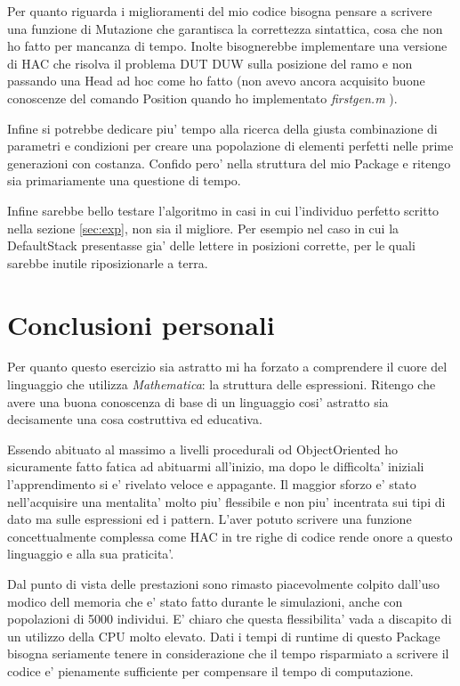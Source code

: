 \documentclass[12pt, a4paper]{article}
\begin{document}
Per quanto riguarda i miglioramenti del mio codice bisogna pensare a scrivere una funzione di Mutazione che garantisca la correttezza sintattica, cosa che non ho fatto per mancanza di tempo. Inolte bisognerebbe implementare una versione di HAC che risolva il problema DUT DUW sulla posizione del ramo e non passando una Head ad hoc come ho fatto (non avevo ancora acquisito buone conoscenze del comando Position quando ho implementato {\itshape firstgen.m }).

Infine si potrebbe dedicare piu' tempo alla ricerca della giusta combinazione di parametri e condizioni per creare una popolazione di elementi perfetti nelle prime generazioni con costanza. Confido pero' nella struttura del mio Package e ritengo sia primariamente una questione di tempo.

Infine sarebbe bello testare l'algoritmo in casi in cui l'individuo perfetto scritto nella sezione \ref{sec:exp}, non sia il migliore. Per esempio nel caso in cui la DefaultStack presentasse gia' delle lettere in posizioni corrette, per le quali sarebbe inutile riposizionarle a terra.

\section{Conclusioni personali}
Per quanto questo esercizio sia astratto mi ha forzato a comprendere il cuore del linguaggio che utilizza {\itshape Mathematica}: la struttura delle espressioni. Ritengo che avere una buona conoscenza di base di un linguaggio cosi' astratto sia decisamente una cosa costruttiva ed educativa.

Essendo abituato al massimo a livelli procedurali od ObjectOriented ho sicuramente fatto fatica ad abituarmi all'inizio, ma dopo le difficolta' iniziali l'apprendimento si e' rivelato veloce e appagante. Il maggior sforzo e' stato nell'acquisire una mentalita' molto piu' flessibile e non piu' incentrata sui tipi di dato ma sulle espressioni ed i pattern.
L'aver potuto scrivere una funzione concettualmente complessa come HAC in tre righe di codice rende onore a questo linguaggio e alla sua praticita'.

Dal punto di vista delle prestazioni sono rimasto piacevolmente colpito dall'uso modico dell memoria che e' stato fatto durante le simulazioni, anche con popolazioni di 5000 individui.
E' chiaro che questa flessibilita' vada a discapito di un utilizzo della CPU molto elevato. Dati i tempi di runtime di questo Package bisogna seriamente tenere in considerazione che il tempo risparmiato a scrivere il codice e' pienamente sufficiente per compensare il tempo di computazione.
\end{document}

